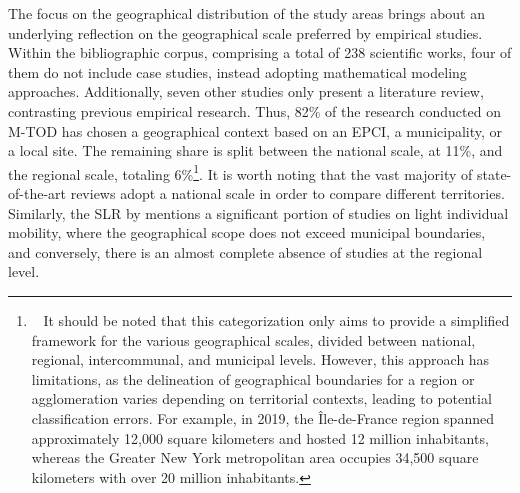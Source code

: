 \begin{refsegment}
The focus on the geographical distribution of the study areas brings about an underlying reflection on the geographical scale preferred by empirical studies. Within the bibliographic corpus, comprising a total of 238 scientific works, four of them do not include case studies, instead adopting mathematical modeling approaches. Additionally, seven other studies only present a literature review, contrasting previous empirical research. Thus, 82\% of the research conducted on \acrshort{M-TOD} has chosen a geographical context based on an \acrfull{EPCI}, a municipality, or a local site. The remaining share is split between the national scale, at 11\%, and the regional scale, totaling 6\%\footnote{~
    It should be noted that this categorization only aims to provide a simplified framework for the various geographical scales, divided between national, regional, intercommunal, and municipal levels. However, this approach has limitations, as the delineation of geographical boundaries for a region or agglomeration varies depending on territorial contexts, leading to potential classification errors. For example, in 2019, the Île-de-France region spanned approximately 12,000 square kilometers and hosted 12 million inhabitants, whereas the Greater New York metropolitan area occupies 34,500 square kilometers with over 20 million inhabitants.
}. It is worth noting that the vast majority of state-of-the-art reviews adopt a national scale in order to compare different territories. Similarly, the \acrshort{SLR} by \textcolor{blue}{\textcite[298]{zhang_built_2023}} mentions a significant portion of studies on light individual mobility, where the geographical scope does not exceed municipal boundaries, and conversely, there is an almost complete absence of studies at the regional level.%


\end{refsegment}
